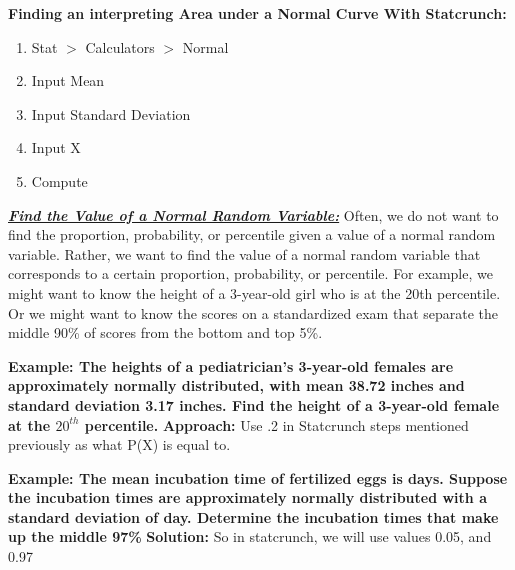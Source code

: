 \documentclass{report}
\begin{document}
    \bigbreak \noindent \bigbreak \noindent 
    \textbf{Finding an interpreting Area under a Normal Curve With Statcrunch:}
    \begin{enumerate}
        \item Stat $> $ Calculators $> $ Normal 
        \item Input Mean
        \item Input Standard Deviation
        \item Input X
        \item Compute
    \end{enumerate}
    
    \bigbreak \noindent \bigbreak \noindent 
    \textbf{\textit{\underline{Find the Value of a Normal Random Variable:}}}
    \bigbreak \noindent 
    Often, we do not want to find the proportion, probability, or percentile given a value of a normal random variable. Rather, we want to find the value of a normal random variable that corresponds to a certain proportion, probability, or percentile. For example, we might want to know the height of a 3-year-old girl who is at the 20th percentile. Or we might want to know the scores on a standardized exam that separate the middle 90\% of scores from the bottom and top 5\%.

    \bigbreak \noindent 
    \begin{mdframed}
        \textbf{Example: The heights of a pediatrician's 3-year-old females are approximately normally distributed, with mean 38.72 inches and standard deviation 3.17 inches. Find the height of a 3-year-old female at the $20^{th} $ percentile.}
        \bigbreak \noindent 
        \textbf{Approach:}
        \bigbreak \noindent 
        Use .2 in Statcrunch steps mentioned previously as what P(X) is equal to.
    \end{mdframed}
    \bigbreak \noindent 
    \begin{mdframed}
        \textbf{Example: The mean incubation time of fertilized eggs is  days. Suppose the incubation times are approximately normally distributed with a standard deviation of  day. Determine the incubation times that make up the middle 97\%}
        \bigbreak \noindent 
        \textbf{Solution:}
        \bigbreak \noindent 
        So in statcrunch, we will use values 0.05, and 0.97
    \end{mdframed}
\end{document}
